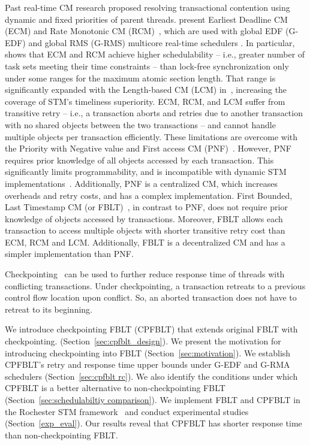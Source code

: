 \documentclass[conference]{IEEEtran}
\begin{document}
Past real-time CM research proposed resolving transactional contention using dynamic and fixed priorities of parent threads. \cite{6045438,stmconcurrencycontrol:emsoft11,lcmdac2012} present  Earliest Deadline CM (ECM) and Rate Monotonic CM (RCM)~, which are used with global EDF (G-EDF) and global RMS (G-RMS) multicore real-time schedulers \cite{Davis:2011:SHR:1978802.1978814}.
In particular,~\cite{stmconcurrencycontrol:emsoft11} shows that ECM and RCM achieve higher schedulability -- i.e., greater number of task sets meeting their time constraints -- than lock-free synchronization only under some ranges for the maximum atomic section length. That range is significantly expanded with the Length-based CM (LCM) in~\cite{lcmdac2012}, increasing the coverage of STM's timeliness superiority. ECM, RCM, and LCM suffer from transitive retry -- i.e., a transaction aborts and retries due to another transaction with no shared objects between the two transactions -- and cannot handle multiple objects per transaction efficiently. These limitations are overcome with the Priority with Negative value and First access CM (PNF)~\cite{pnf_dac_asp,shambake_phd_proposal}. However, PNF requires prior knowledge of all objects accessed by each transaction. This significantly limits programmability, and is incompatible with dynamic STM implementations~\cite{Herlihy:2003:STM:872035.872048}. Additionally, PNF is a centralized CM, which increases overheads and retry costs, and has a complex implementation. First Bounded, Last Timestamp CM (or FBLT)~\cite{fblt}, in contrast to PNF, does not require prior knowledge of objects accessed by transactions. Moreover, FBLT allows each transaction to access multiple objects with shorter transitive retry cost than ECM, RCM and LCM. Additionally, FBLT is a decentralized CM and has a simpler implementation than PNF.

Checkpointing~\cite{Koskinen:2008:CCI:1378533.1378563} can be used to further reduce response time of threads with conflicting transactions. Under checkpointing, a transaction retreats to a previous control flow location upon conflict. So, an aborted transaction does not have to retreat to its beginning.

We introduce checkpointing FBLT (CPFBLT) that extends original FBLT with checkpointing. (Section~\ref{sec:cpfblt_design}). We present the motivation for introducing checkpointing into FBLT (Section~\ref{sec:motivation}). We establish CPFBLT's retry and response time upper bounds under G-EDF and G-RMA schedulers (Section~\ref{sec:cpfblt rc}). We also identify the conditions under which CPFBLT is a better alternative to non-checkpointing FBLT (Section~\ref{sec:schedulabiltiy comparison}). We implement FBLT and CPFBLT in the Rochester STM framework~\cite{marathe2006lowering} and conduct experimental studies (Section~\ref{exp_eval}). Our results reveal that CPFBLT has shorter response time than non-checkpointing FBLT.
\end{document}
